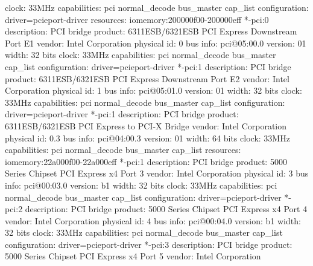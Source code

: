 \documentclass[mingoth,a4paper]{jsarticle}
\begin{document}
{{{{{{{{{\begin{commandline}
                clock: 33MHz
                capabilities: pci normal_decode bus_master cap_list
                configuration: driver=pcieport-driver
                resources: iomemory:200000f00-200000eff
              *-pci:0
                   description: PCI bridge
                   product: 6311ESB/6321ESB PCI Express Downstream Port E1
                   vendor: Intel Corporation
                   physical id: 0
                   bus info: pci@05:00.0
                   version: 01
                   width: 32 bits
                   clock: 33MHz
                   capabilities: pci normal_decode bus_master cap_list
                   configuration: driver=pcieport-driver
              *-pci:1
                   description: PCI bridge
                   product: 6311ESB/6321ESB PCI Express Downstream Port E2
                   vendor: Intel Corporation
                   physical id: 1
                   bus info: pci@05:01.0
                   version: 01
                   width: 32 bits
                   clock: 33MHz
                   capabilities: pci normal_decode bus_master cap_list
                   configuration: driver=pcieport-driver
           *-pci:1
                description: PCI bridge
                product: 6311ESB/6321ESB PCI Express to PCI-X Bridge
                vendor: Intel Corporation
                physical id: 0.3
                bus info: pci@04:00.3
                version: 01
                width: 64 bits
                clock: 33MHz
                capabilities: pci normal_decode bus_master cap_list
                resources: iomemory:22a000f00-22a000eff
        *-pci:1
             description: PCI bridge
             product: 5000 Series Chipset PCI Express x4 Port 3
             vendor: Intel Corporation
             physical id: 3
             bus info: pci@00:03.0
             version: b1
             width: 32 bits
             clock: 33MHz
             capabilities: pci normal_decode bus_master cap_list
             configuration: driver=pcieport-driver
        *-pci:2
             description: PCI bridge
             product: 5000 Series Chipset PCI Express x4 Port 4
             vendor: Intel Corporation
             physical id: 4
             bus info: pci@00:04.0
             version: b1
             width: 32 bits
             clock: 33MHz
             capabilities: pci normal_decode bus_master cap_list
             configuration: driver=pcieport-driver
        *-pci:3
             description: PCI bridge
             product: 5000 Series Chipset PCI Express x4 Port 5
             vendor: Intel Corporation

\end{commandline}}}}}}}}}}
\end{document}
